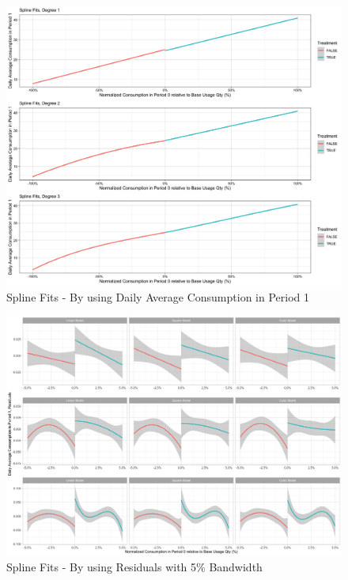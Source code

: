 \clearpage
\begin{figure}
    \centering
    \includegraphics[scale = 0.13]{02_Plots/SMUD-Billing-Data_RD-Approach_Spline_BW-NA}
    \caption{Spline Fits - By using Daily Average Consumption in Period 1}
    \label{Figure:Spline_NA}
\end{figure}


\clearpage
\begin{figure}
    \centering
    \includegraphics[scale = 0.085]{02_Plots/SMUD-Billing-Data_RD-Approach_Residuals_BW-5}
    \caption{Spline Fits - By using Residuals with 5\% Bandwidth}
    \label{Figure:Residuals_5P}
\end{figure}

